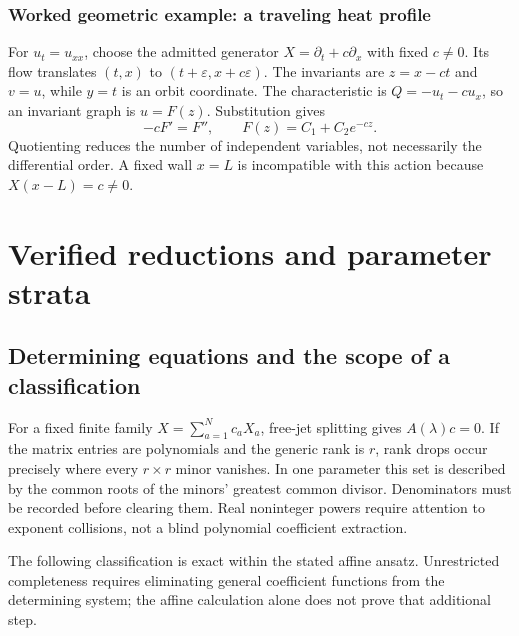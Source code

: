 \documentclass[11pt,a4paper,oneside]{report}
\numberwithin{equation}{chapter}
\begin{document}
\subsection*{Worked geometric example: a traveling heat profile}
For $u_t=u_{xx}$, choose the admitted generator $X=\partial_t+c\partial_x$ with fixed $c\ne0$. Its flow translates $(t,x)$ to $(t+\varepsilon,x+c\varepsilon)$. The invariants are $z=x-ct$ and $v=u$, while $y=t$ is an orbit coordinate. The characteristic is $Q=-u_t-cu_x$, so an invariant graph is $u=F(z)$. Substitution gives
\begin{equation}
-cF'=F'',\qquad F(z)=C_1+C_2e^{-cz}.
\end{equation}
Quotienting reduces the number of independent variables, not necessarily the differential order. A fixed wall $x=L$ is incompatible with this action because $X(x-L)=c\ne0$.

\chapter{Verified reductions and parameter strata}\label{ch:reduction}
\section{Determining equations and the scope of a classification}
For a fixed finite family $X=\sum_{a=1}^Nc_aX_a$, free-jet splitting gives $A(\lambda)c=0$. If the matrix entries are polynomials and the generic rank is $r$, rank drops occur precisely where every $r\times r$ minor vanishes. In one parameter this set is described by the common roots of the minors' greatest common divisor. Denominators must be recorded before clearing them. Real noninteger powers require attention to exponent collisions, not a blind polynomial coefficient extraction.

The following classification is exact within the stated affine ansatz. Unrestricted completeness requires eliminating general coefficient functions from the determining system; the affine calculation alone does not prove that additional step.
\end{document}
